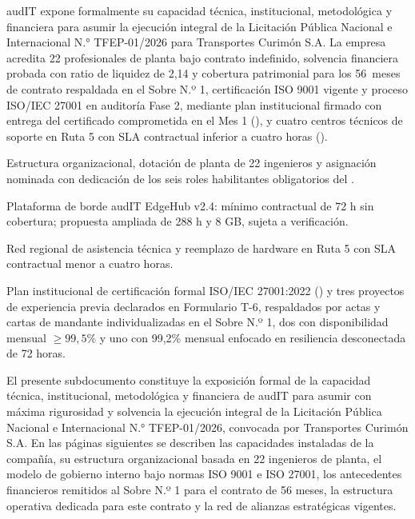 
\begin{resumenApertura}
audIT expone formalmente su capacidad técnica, institucional, metodológica y financiera para asumir la ejecución integral de la Licitación Pública Nacional e Internacional N.° TFEP-01/2026 para Transportes Curimón S.A. La empresa acredita 22 profesionales de planta bajo contrato indefinido, solvencia financiera probada con ratio de liquidez de 2,14 y cobertura patrimonial para los 56~meses de contrato respaldada en el Sobre N.º 1, certificación ISO 9001 vigente y proceso ISO/IEC 27001 en auditoría Fase 2, mediante plan institucional firmado con entrega del certificado comprometida en el Mes 1 (), y cuatro centros técnicos de soporte en Ruta 5 con SLA contractual inferior a cuatro horas ().
\begin{recibe}
  \item Estructura organizacional, dotación de planta de 22 ingenieros y asignación nominada con dedicación de los seis roles habilitantes obligatorios del .
  \item Plataforma de borde audIT EdgeHub v2.4: mínimo contractual de 72 h sin cobertura; propuesta ampliada de 288 h y 8 GB, sujeta a verificación.
  \item Red regional de asistencia técnica y reemplazo de hardware en Ruta 5 con SLA contractual menor a cuatro horas.
  \item Plan institucional de certificación formal ISO/IEC 27001:2022 () y tres proyectos de experiencia previa declarados en Formulario T-6, respaldados por actas y cartas de mandante individualizadas en el Sobre N.º 1, dos con disponibilidad mensual $\ge 99{,}5\%$ y uno con 99,2\% mensual enfocado en resiliencia desconectada de 72 horas.
\end{recibe}
\end{resumenApertura}

El presente subdocumento constituye la exposición formal de la capacidad técnica, institucional, metodológica y financiera de audIT para asumir con máxima rigurosidad y solvencia la ejecución integral de la Licitación Pública Nacional e Internacional N.° TFEP-01/2026, convocada por Transportes Curimón S.A. En las páginas siguientes se describen las capacidades instaladas de la compañía, su estructura organizacional basada en 22 ingenieros de planta, el modelo de gobierno interno bajo normas ISO 9001 e ISO 27001, los antecedentes financieros remitidos al Sobre N.º 1 para el contrato de 56 meses, la estructura operativa dedicada para este contrato y la red de alianzas estratégicas vigentes.

